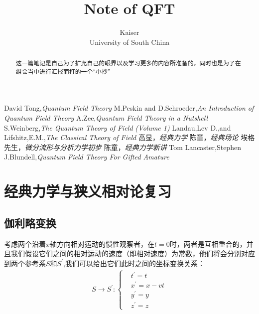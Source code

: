 \documentclass{article}
\title{Note of QFT}
\author{Kaiser\\University of South China}
\begin{document}
\maketitle

\begin{abstract}
    \normalsize
    这一篇笔记是自己为了扩充自己的眼界以及学习更多的内容所准备的，同时也是为了在组会当中进行汇报而打的一个“小抄”
\end{abstract}

\begin{center}
    \large
    \begin{thebibliography}{99} 
         David Tong,\textit{Quantum Field Theory}
         M.Peskin and D.Schroeder,\textit{An Introduction of Quantum Field Theory}
         A.Zee,\textit{Quantum Field Theory in a Nutshell}
         S.Weinberg,\textit{The Quantum Theory of Field (Volume 1)}
         Landau,Lev D.,and Lifshitz,E.M.,\textit{The Classical Theory of Field}
         高显，\textit{经典力学}
         陈童，\textit{经典场论}
         埃格先生，\textit{微分流形与分析力学初步}
         陈童，\textit{经典力学新讲}
         Tom Lancaster,Stephen J.Blundell,\textit{Quantum Field Theory For Gifted Amature}
    \end{thebibliography}
\end{center}




\begin{center}
    \tableofcontents
\end{center}
\newpage





\section{经典力学与狭义相对论复习}

\subsection{伽利略变换}
考虑两个沿着$x$轴方向相对运动的惯性观察者，在$t=0$时，两者是互相重合的，并且我们假设它们之间的相对运动的速度（即相对速度）为常数，他们将会分别对应到两个参考系$S$和$S^\prime$,我们可以给出它们此时之间的坐标变换关系：
\begin{align*}
    S\to S^\prime:
    \begin{cases}
        &t^\prime=t\\
        &x^\prime=x-vt\\
        &y^\prime=y\\
        &z^\prime=z
    \end{cases}
\end{align*}
\end{document}
